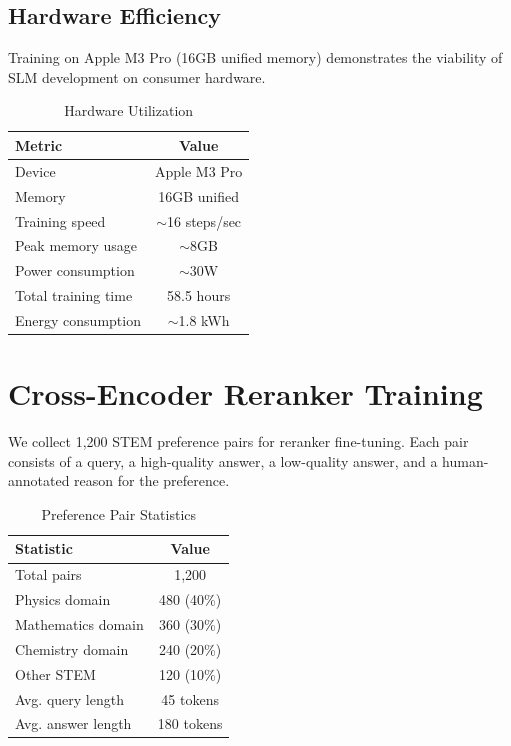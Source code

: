 \documentclass[11pt,a4paper]{article}
\theoremstyle{plain}
\theoremstyle{definition}
\begin{document}
\subsection{Hardware Efficiency}

Training on Apple M3 Pro (16GB unified memory) demonstrates the
viability of SLM development on consumer hardware.

\begin{table}[H]
\centering
\caption{Hardware Utilization}
\begin{tabular}{lc}
\toprule
\textbf{Metric} & \textbf{Value} \\
\midrule
Device & Apple M3 Pro \\
Memory & 16GB unified \\
Training speed & $\sim$16 steps/sec \\
Peak memory usage & $\sim$8GB \\
Power consumption & $\sim$30W \\
Total training time & 58.5 hours \\
Energy consumption & $\sim$1.8 kWh \\
\bottomrule
\end{tabular}
\end{table}

\section{Cross-Encoder Reranker Training}
\label{sec:reranker_training}

We collect 1,200 STEM preference pairs for reranker fine-tuning.
Each pair consists of a query, a high-quality answer, a low-quality
answer, and a human-annotated reason for the preference.

\begin{table}[H]
\centering
\caption{Preference Pair Statistics}
\begin{tabular}{lc}
\toprule
\textbf{Statistic} & \textbf{Value} \\
\midrule
Total pairs & 1,200 \\
Physics domain & 480 (40\%) \\
Mathematics domain & 360 (30\%) \\
Chemistry domain & 240 (20\%) \\
Other STEM & 120 (10\%) \\
Avg. query length & 45 tokens \\
Avg. answer length & 180 tokens \\
\bottomrule
\end{tabular}
\end{table}
\end{document}

